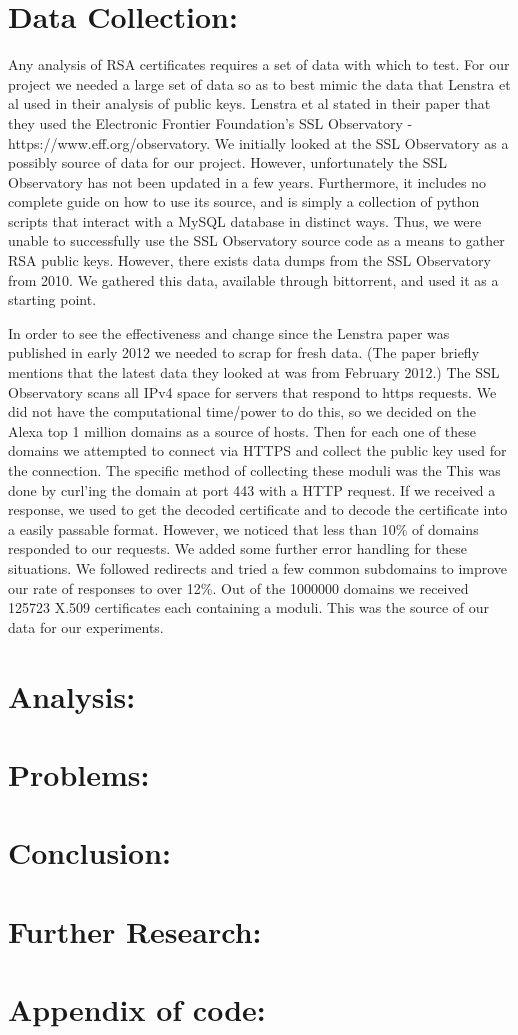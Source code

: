 \documentclass[12pt]{article}
\begin{document}
\section{Data Collection:}
Any analysis of RSA certificates requires a set of data with which to test. For our project we needed a large set of data so as to best mimic the data that Lenstra
et al used in their analysis of public keys. Lenstra et al stated in their paper that they used the Electronic Frontier Foundation's SSL Observatory - https://www.eff.org/observatory. We initially looked at the SSL Observatory as a possibly source of data for our project. However, unfortunately the SSL Observatory has not been updated in a few years. Furthermore, it includes no complete guide on how to use its source, and is simply a collection of python scripts that interact with a MySQL database in distinct ways. Thus, we were unable to successfully use the SSL Observatory source code as a means to gather RSA public keys. However, there exists data dumps from the SSL Observatory from 2010. We gathered this data, available through bittorrent, and used it as a starting point.

In order to see the effectiveness and change since the Lenstra paper was published in early 2012 we needed to scrap for fresh data. (The paper briefly mentions that the latest data they looked at was from February 2012.) The SSL Observatory scans all IPv4 space for servers that respond to https requests. We did not have the computational time/power to do this, so we decided on the Alexa top 1 million domains as a source of hosts. Then for each one of these domains we attempted to connect via HTTPS and collect the public key used for the connection. The specific method of collecting these moduli was the  This was done by curl'ing the domain at port 443 with a HTTP request. If we received a response, we used  to get the decoded certificate and  to decode the certificate into a easily passable format.  However, we noticed that less than 10\% of domains responded to our requests. We added some further error handling for these situations. We followed redirects and tried a few common subdomains to improve our rate of responses to over 12\%. Out of the 1000000 domains we received 125723 X.509 certificates each containing a moduli. This was the source of our data for our experiments.

\section{Analysis:}

\section{Problems:}

\section{Conclusion:}

\section{Further Research:}

\appendix
\section{Appendix of code:}
\end{document}
